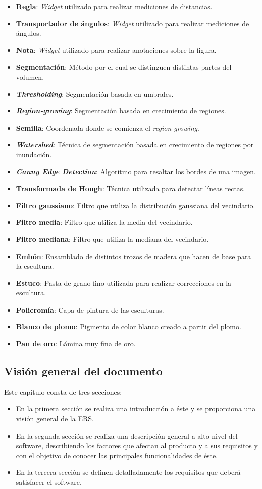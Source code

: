 \begin{itemize}
	\item \textbf{Regla}: \textit{Widget} utilizado para realizar mediciones de distancias.
	\item \textbf{Transportador de ángulos}: \textit{Widget} utilizado para realizar mediciones de ángulos.
	\item \textbf{Nota}: \textit{Widget} utilizado para realizar anotaciones sobre la figura.
	\item \textbf{Segmentación}: Método por el cual se distinguen distintas partes del volumen.
	\item \textbf{\textit{Thresholding}}: Segmentación basada en umbrales.
	\item \textbf{\textit{Region-growing}}: Segmentación basada en crecimiento de regiones.
	\item \textbf{Semilla}: Coordenada donde se comienza el \textit{region-growing}.
	\item \textbf{\textit{Watershed}}: Técnica de segmentación basada en crecimiento de regiones por inundación.
	\item \textbf{\textit{Canny Edge Detection}}: Algoritmo para resaltar los bordes de una imagen.
	\item \textbf{Transformada de Hough}: Técnica utilizada para detectar líneas rectas.
	\item \textbf{Filtro gaussiano}: Filtro que utiliza la distribución gaussiana del vecindario.
	\item \textbf{Filtro media}: Filtro que utiliza la media del vecindario.
	\item \textbf{Filtro mediana}: Filtro que utiliza la mediana del vecindario.
	\item \textbf{Embón}: Ensamblado de distintos trozos de madera que hacen de base para la escultura.
	\item \textbf{Estuco}: Pasta de grano fino utilizada para realizar correcciones en la escultura.
	\item \textbf{Policromía}: Capa de pintura de las esculturas.
	\item \textbf{Blanco de plomo}: Pigmento de color blanco creado a partir del plomo.
	\item \textbf{Pan de oro}: Lámina muy fina de oro.
\end{itemize}

\subsection{Visión general del documento}

Este capítulo consta de tres secciones:
\begin{itemize}
	\item En la primera sección se realiza una introducción a éste y se proporciona una visión general de la ERS.
	\item En la segunda sección se realiza una descripción general a alto nivel del software, describiendo los factores que afectan al producto y a sus requisitos y con el objetivo de conocer las principales funcionalidades de éste.
	\item En la tercera sección se definen detalladamente los requisitos que deberá satisfacer el software.
\end{itemize}

